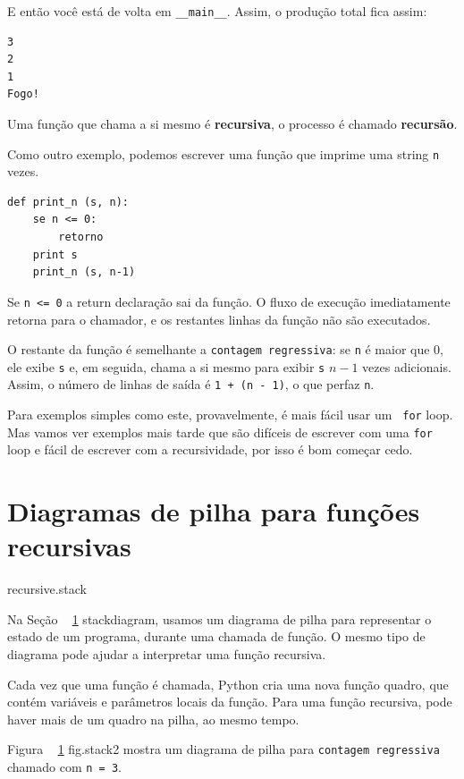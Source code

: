 \documentclass[10pt]{book}
\begin{document}
\begin{exercise}
{E então você está de volta em \verb "__main__". Assim, o
produção total fica assim:

\begin{verbatim}
3
2
1
Fogo!
\end{verbatim}
%
Uma função que chama a si mesmo é {\bf recursiva}, o processo é
chamado {\bf recursão}.

Como outro exemplo, podemos escrever uma função que imprime uma
string {\tt n} vezes.

\begin{verbatim}
def print_n (s, n):
    se n <= 0:
        retorno
    print s
    print_n (s, n-1)
\end{verbatim}
%
Se {\tt n <= 0} a {return \tt} declaração sai da função. O
fluxo de execução imediatamente retorna para o chamador, e os restantes
linhas da função não são executados.

O restante da função é semelhante a {\tt contagem regressiva}: se {\tt n} é
maior que 0, ele exibe {\tt s} e, em seguida, chama a si mesmo para exibir
{\tt s} $ n-1 $ vezes adicionais. Assim, o número de linhas de saída
é {\tt 1 + (n - 1)}, o que perfaz
{\tt n}.

Para exemplos simples como este, provavelmente, é mais fácil usar um {\tt
for} loop. Mas vamos ver exemplos mais tarde que são difíceis de escrever
com uma {\tt for} loop e fácil de escrever com a recursividade, por isso é
bom começar cedo.



\section{Diagramas de pilha para funções recursivas}
\label{} recursive.stack

Na Seção ~ \ref {} stackdiagram, usamos um diagrama de pilha para representar
o estado de um programa, durante uma chamada de função. O mesmo tipo de
diagrama pode ajudar a interpretar uma função recursiva.

Cada vez que uma função é chamada, Python cria uma nova função
quadro, que contém variáveis ​​e parâmetros locais da função.
Para uma função recursiva, pode haver mais de um quadro na
pilha, ao mesmo tempo.

Figura ~ \ref {} fig.stack2 mostra um diagrama de pilha para {\tt contagem regressiva} chamado com
{\tt n = 3}.

}
\end{exercise}
\end{document}
